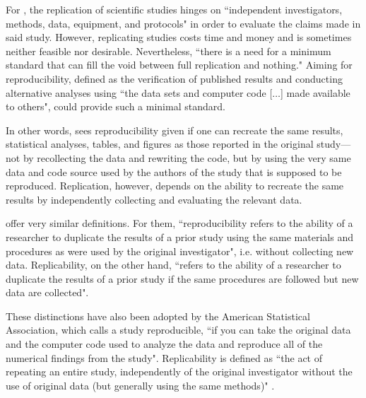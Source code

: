 \documentclass[11pt, a4paper,twoside]{report}\usepackage[]{graphicx}\usepackage[]{color}
\begin{document}
For \cite{peng_reproducible_2009}, the replication of scientific studies hinges on ``independent investigators, methods, data, equipment, and protocols" in order to evaluate the claims made in said study. However, replicating studies costs time and money and is sometimes neither feasible nor desirable. Nevertheless, ``there is a need for a minimum standard that can fill the void between full replication and nothing." Aiming for reproducibility, defined as the verification of published results and conducting alternative analyses using ``the data sets and computer code [$\dots$] made available to others", could provide such a minimal standard. 

In other words, \cite{peng_reproducible_2009} sees reproducibility given if one can recreate the same results, statistical analyses, tables, and figures as those reported in the original study---not by recollecting the data and rewriting the code, but by using the very same data and code source used by the authors of the study that is supposed to be reproduced. Replication, however, depends on the ability to recreate the same results by independently collecting and evaluating the relevant data.

\cite{cacioppo_social_2015} offer very similar definitions. For them, ``reproducibility refers to the ability of a researcher to duplicate the results of a prior study using the same materials and procedures as were used by the original investigator", i.e. without collecting new data. Replicability, on the other hand, ``refers to the ability of a researcher to duplicate the results of a prior study if the same procedures are followed but new data are collected".

These distinctions have also been adopted by the American Statistical Association, which calls a study reproducible, ``if you can take the original data and the computer code used to analyze the data and reproduce all of the numerical findings from the study". Replicability is defined as ``the act of repeating an entire study, independently of the original investigator without the use of original data (but generally using the same methods)" \citep{broman_recommendation_2017}.
\end{document}
